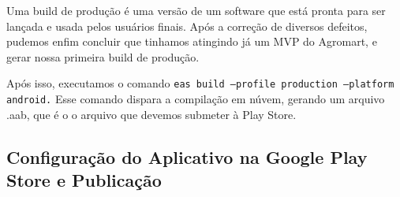 Uma build de produção é uma versão de um software que está pronta para ser lançada e usada pelos usuários finais. Após a correção de diversos defeitos, pudemos enfim concluir que tinhamos atingindo já um MVP do Agromart, e gerar nossa primeira build de produção.

Após isso, executamos o comando \texttt{eas build --profile production --platform android.} Esse comando dispara a compilação em núvem, gerando um arquivo .aab, que é o o arquivo que devemos submeter à Play Store.

\subsection{Configuração do Aplicativo na Google Play Store e Publicação}
